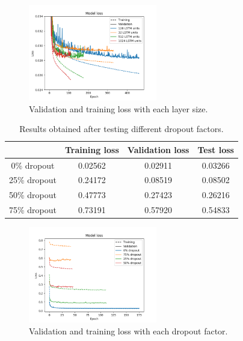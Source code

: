 \documentclass[]{article}
\begin{document}
	\begin{figure}[H]
		\centering
		\includegraphics[width=0.5\textwidth]{variables_1}
		\caption{Validation and training loss with each layer size.}
		\label{f:variables_1}
	\end{figure}
	
	\begin{table}[H]
		\centering
		\begin{tabular}{@{}cccc@{}}
			\toprule
			& Training loss & Validation loss & Test loss \\ \midrule
			0\% dropout  & 0.02562       & 0.02911         & 0.03266   \\
			25\% dropout & 0.24172       & 0.08519         & 0.08502   \\
			50\% dropout & 0.47773       & 0.27423         & 0.26216   \\
			75\% dropout & 0.73191       & 0.57920         & 0.54833   \\ \bottomrule
		\end{tabular}
		\caption{Results obtained after testing different dropout factors.}
		\label{t:variables_2}
	\end{table}
	
	\begin{figure}[H]
		\centering
		\includegraphics[width=0.5\textwidth]{variables_2}
		\caption{Validation and training loss with each dropout factor.}
		\label{f:variables_2}
	\end{figure}
	
\end{document}
